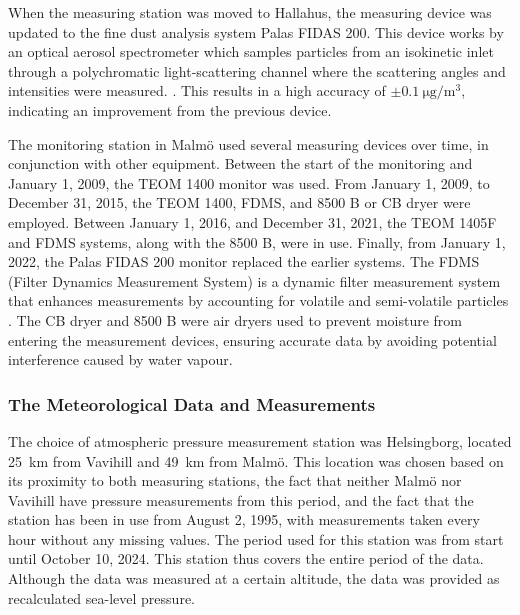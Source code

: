 When the measuring station was moved to Hallahus, the measuring device was updated to the fine dust analysis system Palas FIDAS 200. This device works by an optical aerosol spectrometer which samples particles from an isokinetic inlet through a polychromatic light-scattering channel where the scattering angles and intensities were measured. \cite{palasgmbhOperatingManualFidas}. This results in a high accuracy of $\pm\SI{0.1}{\micro\gram\per\meter\cubed}$, indicating an improvement from the previous device. 

The monitoring station in Malmö used several measuring devices over time, in conjunction with other equipment. Between the start of the monitoring and January 1, 2009, the TEOM 1400 monitor was used. From January 1, 2009, to December 31, 2015, the TEOM 1400, FDMS, and 8500 B or CB dryer were employed. Between January 1, 2016, and December 31, 2021, the TEOM 1405F and FDMS systems, along with the 8500 B, were in use. Finally, from January 1, 2022, the Palas FIDAS 200 monitor replaced the earlier systems. The FDMS (Filter Dynamics Measurement System) is a dynamic filter measurement system that enhances measurements by accounting for volatile and semi-volatile particles \cite{thermoscientific8500FDMSFilter2010}. The CB dryer and 8500 B were air dryers used to prevent moisture from entering the measurement devices, ensuring accurate data by avoiding potential interference caused by water vapour.

\subsubsection{The Meteorological Data and Measurements}
The choice of atmospheric pressure measurement station was Helsingborg, located \SI{25}{\km} from Vavihill and \SI{49}{\km} from Malmö. This location was chosen based on its proximity to both \PM measuring stations, the fact that neither Malmö nor Vavihill have pressure measurements from this period, and the fact that the station has been in use from August 2, 1995, with measurements taken every hour without any missing values. The period used for this station was from start until October 10, 2024. This station thus covers the entire period of the \PM data. Although the data was measured at a certain altitude, the data was provided as recalculated sea-level pressure.

